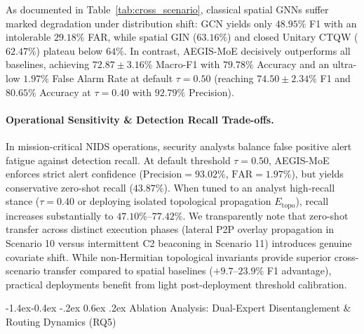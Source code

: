 \documentclass[10pt,twocolumn,letterpaper]{article}
\makeatletter
\renewcommand\subsection{\@startsection{subsection}{2}{\z@}%
                                     {-1.4ex\@plus -0.4ex \@minus -.2ex}%
                                     {0.6ex \@plus .2ex}%
                                     {\normalfont\normalsize\bfseries}}
\makeatother
\begin{document}
As documented in Table~\ref{tab:cross_scenario}, classical spatial GNNs suffer marked degradation under distribution shift: GCN yields only $48.95\%$ F1 with an intolerable $29.18\%$ FAR, while spatial GIN ($63.16\%$) and closed Unitary CTQW ($62.47\%$) plateau below $64\%$. In contrast, AEGIS-MoE decisively outperforms all baselines, achieving $\mathbf{72.87 \pm 3.16\%}$ Macro-F1 with $\mathbf{79.78\%}$ Accuracy and an ultra-low $\mathbf{1.97\%}$ False Alarm Rate at default $\tau=0.50$ (reaching $\mathbf{74.50 \pm 2.34\%}$ F1 and $\mathbf{80.65\%}$ Accuracy at $\tau=0.40$ with $92.79\%$ Precision). 

\paragraph{Operational Sensitivity \& Detection Recall Trade-offs.}
In mission-critical NIDS operations, security analysts balance false positive alert fatigue against detection recall. At default threshold $\tau=0.50$, AEGIS-MoE enforces strict alert confidence ($\text{Precision} = 93.02\%$, $\text{FAR} = 1.97\%$), but yields conservative zero-shot recall ($43.87\%$). When tuned to an analyst high-recall stance ($\tau=0.40$ or deploying isolated topological propagation $E_{\text{topo}}$), recall increases substantially to $47.10\%\text{--}77.42\%$. We transparently note that zero-shot transfer across distinct execution phases (lateral P2P overlay propagation in Scenario 10 versus intermittent C2 beaconing in Scenario 11) introduces genuine covariate shift. While non-Hermitian topological invariants provide superior cross-scenario transfer compared to spatial baselines ($+9.7\text{--}23.9\%$ F1 advantage), practical deployments benefit from light post-deployment threshold calibration.

\subsection{Ablation Analysis: Dual-Expert Disentanglement \& Routing Dynamics (RQ5)}
\label{sec:ablation_moe}
\end{document}
